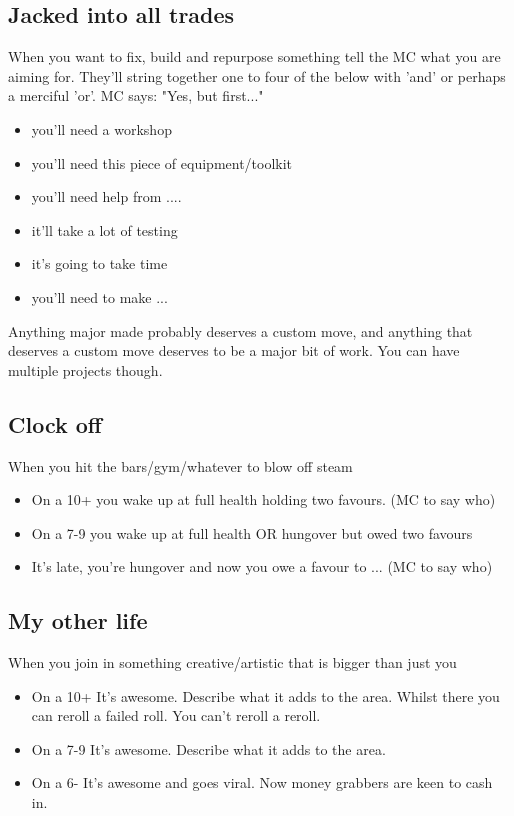 \documentclass{tufte-book}
\begin{document}
\subsection{Jacked into all trades}
When you want to fix, build and repurpose something tell the MC what you are aiming for. They'll string together one to four of the below with 'and' or perhaps a merciful 'or'.
MC says: "Yes, but first..."
\begin{itemize}
\item you'll need a workshop
\item you'll need this piece of equipment/toolkit
\item you'll need help from ....
\item it'll take a lot of testing
\item it's going to take time
\item you'll need to make ...
\end{itemize}
Anything major made probably deserves a custom move, and anything that deserves a custom move deserves to be a major bit of work. You can have multiple projects though.

\subsection{Clock off}
When you hit the bars/gym/whatever to blow off steam 
\begin{itemize}
\item On a 10+ you wake up at full health holding two favours. (MC to say who)
\item On a 7-9 you wake up at full health OR hungover but owed two favours
\item It's late, you're hungover and now you owe a favour to ... (MC to say who)
\end{itemize}

\subsection{My other life}
When you join in something creative/artistic that is bigger than just you 
\begin{itemize}
\item On a 10+ It's awesome. Describe what it adds to the area. Whilst there you can reroll a failed roll. You can't reroll a reroll.
\item On a 7-9 It's awesome. Describe what it adds to the area.
\item On a 6- It's awesome and goes viral. Now money grabbers are keen to cash in.
\end{itemize}
\end{document}
